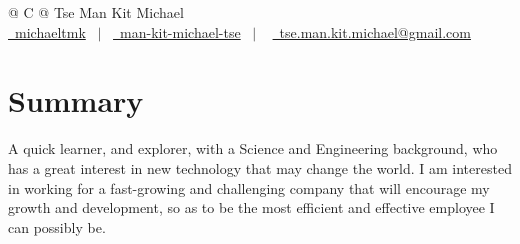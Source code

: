 \documentclass[a4paper,12pt]{article}
\begin{document}
\pagestyle{empty} 



\begin{tabularx}{\linewidth}{@{} C @{}}
\Huge{Tse Man Kit Michael} \\[7.5pt]
\href{https://github.com/michaeltmk}{\raisebox{-0.05\height}\faGithub\ michaeltmk} \ $|$ \ 
\href{https://linkedin.com/in/man-kit-michael-tse-4013a5176}{\raisebox{-0.05\height}\faLinkedin\ man-kit-michael-tse} \ $|$ \ 
\href{mailto:tse.man.kit.michael@gmail.com}{\raisebox{-0.05\height}\faEnvelope \ tse.man.kit.michael@gmail.com} \ 
\end{tabularx}


\section{Summary}
A quick learner, and explorer, with a Science and Engineering background, who has a great interest in new technology that may change the world. I am interested in working for a fast-growing and challenging company that will encourage my growth and development, so as to be the most efficient and effective employee I can possibly be.

\end{document}
